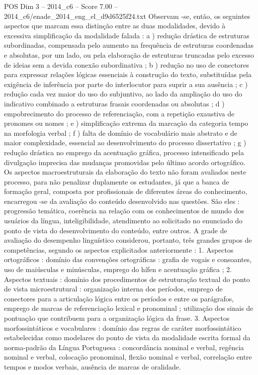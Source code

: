 \begin{textsample}{POS Dim 3 – 2014\_c6 – Score 7.00 – 2014\_c6/enade\_2014\_eng\_el\_d9d6525f24.txt}
Observam -se, então, os seguintes aspectos que marcam essa distinção entre as duas modalidades, devido à excessiva simplificação da modalidade falada : a ) redução drástica de estruturas subordinadas, compensada pelo aumento na frequência de estruturas coordenadas e absolutas, por um lado, ou pela elaboração de estruturas truncadas pelo excesso de ideias sem a devida conexão subordinativa ; b ) redução no uso de conectores para expressar relações lógicas essenciais à construção do texto, substituídas pela exigência de inferência por parte do interlocutor para suprir a sua ausência ; c ) redução cada vez maior do uso do subjuntivo, ao lado da ampliação do uso do indicativo combinado a estruturas frasais coordenadas ou absolutas ; d ) empobrecimento do processo de referenciação, com a repetição exaustiva de pronomes ou nomes ; e ) simplificação extrema da marcação da categoria tempo na morfologia verbal ; f ) falta de domínio de vocabulário mais abstrato e de maior complexidade, essencial ao desenvolvimento do processo dissertativo ; g ) redução drástica no emprego da acentuação gráfica, processo intensificado pela divulgação imprecisa das mudanças promovidas pelo último acordo ortográfico.
Os aspectos macroestruturais da elaboração do texto não foram avaliados neste processo, para não penalizar duplamente os estudantes, já que a banca de formação geral, composta por profissionais de diferentes áreas do conhecimento, encarregou -se da avaliação do conteúdo desenvolvido nas questões.
São eles : progressão temática, coerência na relação com os conhecimentos de mundo dos usuários da língua, inteligibilidade, atendimento ao solicitado no enunciado do ponto de vista do desenvolvimento do conteúdo, entre outros.
A grade de avaliação do desempenho linguístico considerou, portanto, três grandes grupos de competências, segundo os aspectos explicitados anteriormente : 1.
Aspectos ortográficos : domínio das convenções ortográficas : grafia de vogais e consoantes, uso de maiúsculas e minúsculas, emprego do hífen e acentuação gráfica ; 2.
Aspectos textuais : domínio dos procedimentos de estruturação textual do ponto de vista microestrutural : organização interna dos períodos, emprego de conectores para a articulação lógica entre os períodos e entre os parágrafos, emprego de marcas de referenciação lexical e pronominal ; utilização dos sinais de pontuação que contribuem para a organização lógica da frase. 3.
Aspectos morfossintáticos e vocabulares : domínio das regras de caráter morfossintático estabelecidas como modelares do ponto de vista da modalidade escrita formal da norma-padrão da Língua Portuguesa : concordância nominal e verbal, regência nominal e verbal, colocação pronominal, flexão nominal e verbal, correlação entre tempos e modos verbais, ausência de marcas de oralidade.

\end{textsample}
